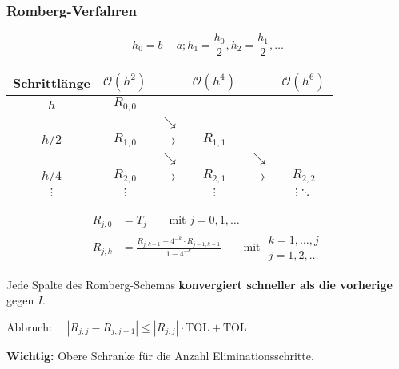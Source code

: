 		\subsubsection{Romberg-Verfahren}
			\[
				h_0 = b-a ; h_1=\frac{h_0}{2}, h_2 = \frac{h_1}{2}, \dots
			\]
			\begin{center}
				\begin{tabular}{c|ccccc}
					\toprule
					Schrittlänge & $\mathcal{O}\left( h^2\right)$ & & $\mathcal{O}\left( h^4\right)$ & & $\mathcal{O}\left( h^6\right)$ \\
					\midrule $h$ & $R_{0,0}$ & & & & \\
					& & $\searrow$ & & & \\
					$h/2$ & $R_{1,0}$ & $\rightarrow$ & $R_{1,1}$ & & \\
					& & $\searrow$ & & $\searrow$ & \\
					$h/4$ & $R_{2,0}$ & $\rightarrow$ & $R_{2,1}$ & $\rightarrow$ & $R_{2,2}$ \\
					$\vdots$ & $\vdots$ & & $\vdots$ & & $\vdots\ddots$ \\
					\bottomrule 
				\end{tabular}
			\end{center}
			\begin{align*}
				R_{j,0} &= T_j \qquad \text{mit } j = 0, 1, \dots \\
				R_{j,k} &= \frac{R_{j,k-1} - 4^{-k}\cdot R_{j-1,k-1}}{1-4^{-k}} \qquad \text{mit }
				\begin{array}{l}
					k= 1, \dots , j \\
					j = 1,2, \dots
				\end{array}
			\end{align*}
			
			Jede Spalte des Romberg-Schemas \textbf{konvergiert schneller als die vorherige} gegen $I$.
			
			Abbruch: $\quad |R_{j,j}-R_{j,j-1}|\leq |R_{j,j}|\cdot \mathrm{TOL} + \mathrm{TOL}$
			
			\textbf{Wichtig:} Obere Schranke für die Anzahl Eliminationsschritte. 
			
